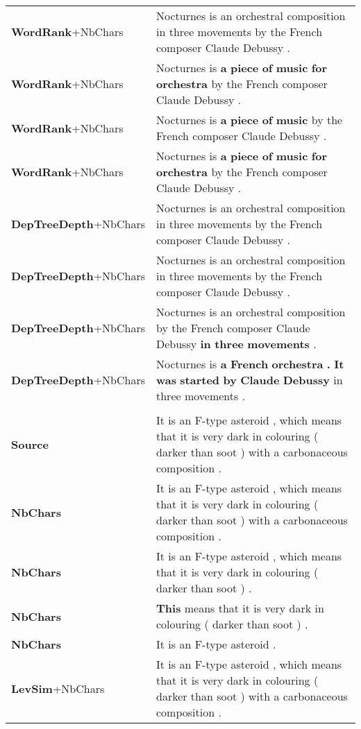 \documentclass[10pt, a4paper]{article}
\begin{document}
\begin{table*}
{\begin{tabular}{ll}
\midrule
\textbf{WordRank}\footnotesize{+NbChars} & Nocturnes is an orchestral composition in three movements by the French composer Claude Debussy . \\
\textbf{WordRank}\footnotesize{+NbChars} & Nocturnes is \textbf{a} \textbf{piece} \textbf{of} \textbf{music} \textbf{for} \textbf{orchestra} by the French composer Claude Debussy . \\
\textbf{WordRank}\footnotesize{+NbChars} & Nocturnes is \textbf{a} \textbf{piece} \textbf{of} \textbf{music} by the French composer Claude Debussy . \\
\textbf{WordRank}\footnotesize{+NbChars} & Nocturnes is \textbf{a} \textbf{piece} \textbf{of} \textbf{music} \textbf{for} \textbf{orchestra} by the French composer Claude Debussy . \\
\midrule
\textbf{DepTreeDepth}\footnotesize{+NbChars} & Nocturnes is an orchestral composition in three movements by the French composer Claude Debussy . \\
\textbf{DepTreeDepth}\footnotesize{+NbChars} & Nocturnes is an orchestral composition in three movements by the French composer Claude Debussy . \\
\textbf{DepTreeDepth}\footnotesize{+NbChars} & Nocturnes is an orchestral composition by the French composer Claude Debussy \textbf{in} \textbf{three} \textbf{movements} . \\
\textbf{DepTreeDepth}\footnotesize{+NbChars} & Nocturnes is \textbf{a} \textbf{French} \textbf{orchestra} \textbf{.} \textbf{It} \textbf{was} \textbf{started} \textbf{by} \textbf{Claude} \textbf{Debussy} in three movements . \\
\midrule
& \\
\midrule
\textbf{Source} & It is an F-type asteroid , which means that it is very dark in colouring ( darker than soot ) with a carbonaceous composition . \\
\midrule
\textbf{NbChars} & It is an F-type asteroid , which means that it is very dark in colouring ( darker than soot ) with a carbonaceous composition . \\
\textbf{NbChars} & It is an F-type asteroid , which means that it is very dark in colouring ( darker than soot ) . \\
\textbf{NbChars} & \textbf{This} means that it is very dark in colouring ( darker than soot ) . \\
\textbf{NbChars} & It is an F-type asteroid . \\
\midrule
\textbf{LevSim}\footnotesize{+NbChars} & It is an F-type asteroid , which means that it is very dark in colouring ( darker than soot ) with a carbonaceous composition . \\

\end{tabular}}
\end{table*}
\end{document}
